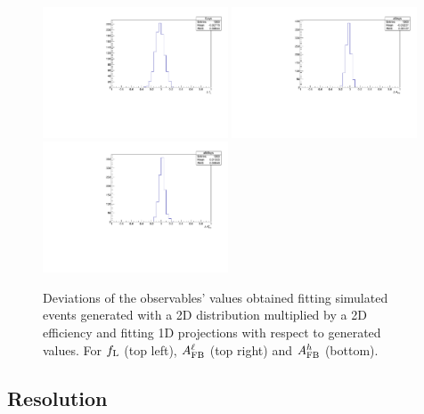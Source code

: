 %
\begin{figure}[h!]
\centering
\includegraphics[width=0.49\textwidth]{Lmumu/figs/fLsys_efficiency.pdf}
\includegraphics[width=0.49\textwidth]{Lmumu/figs/afbsys_efficiency.pdf}
\includegraphics[width=0.49\textwidth]{Lmumu/figs/afbBsys_efficiency.pdf}
\caption{Deviations of the observables' values obtained fitting simulated events
 generated with a 2D distribution multiplied by a 2D efficiency and fitting 1D projections
 with respect to generated values. For $f_{\rm L}$ (top left), 
 $A_{\rm FB}^\ell$ (top right) and $A_{\rm FB}^h$ (bottom). }
\label{fig:effBias}
\end{figure}




\subsection{Resolution}

